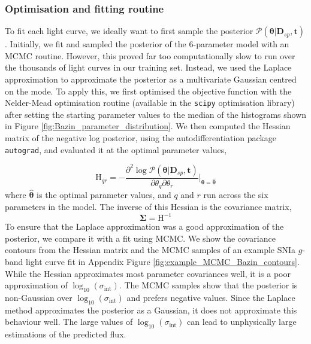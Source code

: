 \documentclass[fleqn,usenatbib]{mnras}
\begin{document}
\subsubsection{Optimisation and fitting routine}
To fit each light curve, we ideally want to first sample the posterior $\mathcal{P}(\bm{\theta}|\bm{D}_{sp},\bm{t})$. Initially, we fit and sampled  the posterior of the 6-parameter model with an MCMC routine. However, this proved far too computationally slow to run over the thousands of light curves in our training set. Instead, we used the Laplace approximation to approximate the posterior as a multivariate Gaussian centred on the mode. To apply this, we first optimised the objective function with the Nelder-Mead optimisation routine (available in the \texttt{scipy} optimisation library) after setting the starting parameter values to the median of the histograms shown in Figure \ref{fig:Bazin_parameter_distribution}. We then computed the Hessian matrix of the negative log posterior, using the autodifferentiation package \texttt{autograd}, and evaluated it at the optimal parameter values,

\begin{equation}
  \mathrm{H}_{qr} = -\frac{\partial^{2} \log{\mathcal{P}(\bm{\theta}|\bm{D}_{sp},\bm{t})}}{\partial \theta_{q} \partial \theta_{r} } \biggr\rvert_{\bm{\theta} = \bm{\hat{\theta}}}
\label{eq:Bazin_Hessian}
\end{equation}
where $\bm{\hat{\theta}}$ is the optimal parameter values, and $q$ and $r$ run across the six parameters in the model. The inverse of this Hessian is the covariance matrix,
\begin{equation}
    \bm{\Sigma} = \bm{\mathrm{H}}^{-1}
\end{equation}
To ensure that the Laplace approximation was a good approximation of the posterior, we compare it with a fit using MCMC. We show the covariance contours from the Hessian matrix and the MCMC samples of an example SNIa $g$-band light curve fit in Appendix Figure \ref{fig:example_MCMC_Bazin_contours}. While the Hessian approximates most parameter covariances well, it is a poor approximation of $\log_{10}{(\sigma_{\mathrm{int}})}$. The MCMC samples show that the posterior is non-Gaussian over $\log_{10}{(\sigma_{\mathrm{int}})}$ and prefers negative values. Since the Laplace method approximates the posterior as a Gaussian, it does not approximate this behaviour well. The large values of $\log_{10}{(\sigma_{\mathrm{int}})}$ can lead to unphysically large estimations of the predicted flux. 
\end{document}
